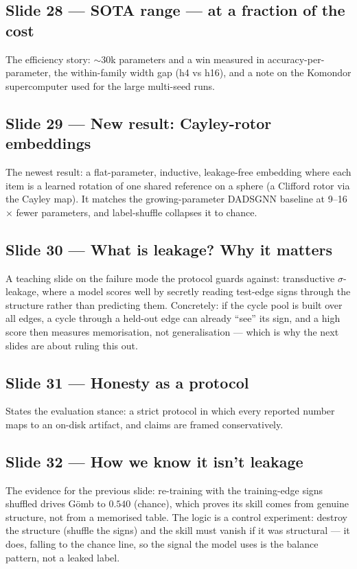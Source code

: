 \documentclass[10pt]{article}
\begin{document}
\subsection*{Slide 28 --- SOTA range --- at a fraction of the cost}
The efficiency story: $\sim$30k parameters and a win measured in accuracy-per-parameter, the within-family width gap (h4 vs h16), and a note on the Komondor supercomputer used for the large multi-seed runs.

\subsection*{Slide 29 --- New result: Cayley-rotor embeddings}
The newest result: a flat-parameter, inductive, leakage-free embedding where each item is a learned rotation of one shared reference on a sphere (a Clifford rotor via the Cayley map). It matches the growing-parameter DADSGNN baseline at 9--16$\times$ fewer parameters, and label-shuffle collapses it to chance.

\subsection*{Slide 30 --- What is leakage? Why it matters}
A teaching slide on the failure mode the protocol guards against: transductive $\sigma$-leakage, where a model scores well by secretly reading test-edge signs through the structure rather than predicting them. Concretely: if the cycle pool is built over all edges, a cycle through a held-out edge can already ``see'' its sign, and a high score then measures memorisation, not generalisation --- which is why the next slides are about ruling this out.

\subsection*{Slide 31 --- Honesty as a protocol}
States the evaluation stance: a strict protocol in which every reported number maps to an on-disk artifact, and claims are framed conservatively.

\subsection*{Slide 32 --- How we know it isn't leakage}
The evidence for the previous slide: re-training with the training-edge signs shuffled drives G\"omb to $0.540$ (chance), which proves its skill comes from genuine structure, not from a memorised table. The logic is a control experiment: destroy the structure (shuffle the signs) and the skill must vanish if it was structural --- it does, falling to the chance line, so the signal the model uses is the balance pattern, not a leaked label.
\end{document}

